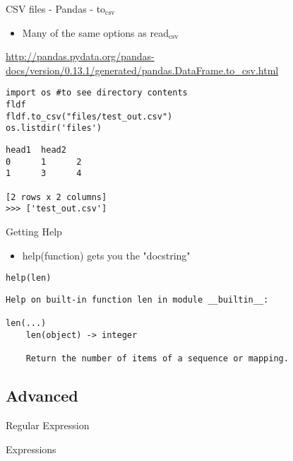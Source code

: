 \documentclass[presentation]{beamer}
\begin{document}
\begin{frame}[fragile,label=sec-4-1-26]{CSV files - Pandas - to$_{\text{csv}}$}
 \begin{itemize}
\item Many of the same options as read$_{\text{csv}}$
\end{itemize}
\url{http://pandas.pydata.org/pandas-docs/version/0.13.1/generated/pandas.DataFrame.to_csv.html}

\lstset{numbers=left,language=Python,label= ,caption= }
\begin{lstlisting}
import os #to see directory contents
fldf
fldf.to_csv("files/test_out.csv")
os.listdir('files')
\end{lstlisting}

\lstset{numbers=left,language=Python,label= ,caption= }
\begin{lstlisting}
head1  head2
0      1      2
1      3      4

[2 rows x 2 columns]
>>> ['test_out.csv']
\end{lstlisting}
\end{frame}


\begin{frame}[fragile,label=sec-4-1-27]{Getting Help}
 \begin{itemize}
\item help(function) gets you the "docstring"
\end{itemize}
\lstset{numbers=left,language=Python,label= ,caption= }
\begin{lstlisting}
help(len)
\end{lstlisting}

\lstset{numbers=left,language=Python,label= ,caption= }
\begin{lstlisting}
Help on built-in function len in module __builtin__:

len(...)
    len(object) -> integer

    Return the number of items of a sequence or mapping.
\end{lstlisting}
\end{frame}


\subsection{Advanced}
\label{sec-4-2}

\begin{frame}[label=sec-4-2-1]{Regular Expression}
\end{frame}

\begin{frame}[label=sec-4-2-2]{Expressions}
\end{frame}
\end{document}
